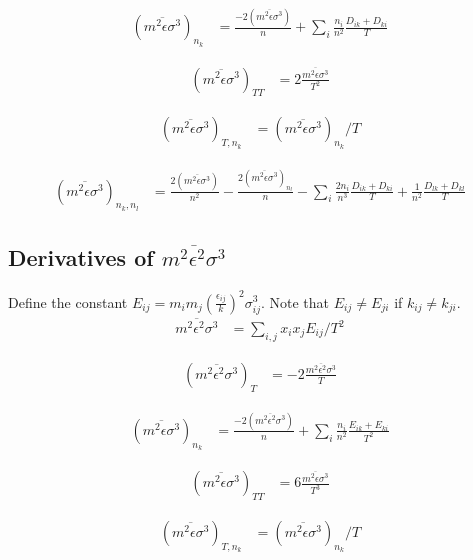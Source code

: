 \documentclass[internal,english]{sintefmemo2012}
\newcommand{\lp}{\left(}
\newcommand{\rp}{\right)}
\begin{document}
\begin{align}
  (\overline{m^2\epsilon\sigma^3})_{n_k} &= \frac{-2(\overline{m^2\epsilon\sigma^3})}{n} + \sum_i \frac{n_i}{n^2} \frac{D_{ik} + D_{ki}}{T}
\end{align}

\begin{align}
  (\overline{m^2\epsilon \sigma^3})_{TT} & = 2\frac{\overline{m^2\epsilon \sigma^3}}{T^2}
\end{align}

\begin{align}
  (\overline{m^2\epsilon\sigma^3})_{T,n_k} &= (\overline{m^2\epsilon\sigma^3})_{n_k}/T
\end{align}

\begin{align}
  (\overline{m^2\epsilon\sigma^3})_{n_k,n_l} &= \frac{2(\overline{m^2\epsilon\sigma^3})}{n^2} - \frac{2(\overline{m^2\epsilon\sigma^3})_{n_l}}{n} - \sum_i \frac{2n_i}{n^3} \frac{D_{ik} + D_{ki}}{T} + \frac{1}{n^2} \frac{D_{lk} + D_{kl}}{T}
\end{align}

\subsection{Derivatives of $\overline{m^2\epsilon^2 \sigma^3}$}
Define the constant $E_{ij} = m_i m_j \lp \frac{\epsilon_{ij}}{k} \rp^2 \sigma_{ij}^3$. Note that
$E_{ij} \neq E_{ji}$ if $k_{ij} \neq k_{ji}$.
\begin{align}
  \overline{m^2\epsilon^2 \sigma^3} &= \sum_{i,j} x_i x_j E_{ij}/T^2
\end{align}

\begin{align}
  (\overline{m^2\epsilon^2 \sigma^3})_T &=  -2 \frac{\overline{m^2\epsilon^2 \sigma^3}}{T}
\end{align}

\begin{align}
  (\overline{m^2\epsilon\sigma^3})_{n_k} &= \frac{-2(\overline{m^2\epsilon^2 \sigma^3})}{n} + \sum_i \frac{n_i}{n^2} \frac{E_{ik} + E_{ki}}{T^2}
\end{align}

\begin{align}
  (\overline{m^2\epsilon \sigma^3})_{TT} & = 6\frac{\overline{m^2\epsilon \sigma^3}}{T^3}
\end{align}

\begin{align}
  (\overline{m^2\epsilon\sigma^3})_{T,n_k} &= (\overline{m^2\epsilon\sigma^3})_{n_k}/T
\end{align}
\end{document}

